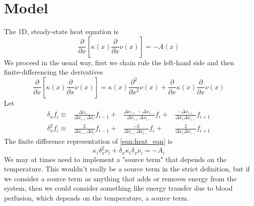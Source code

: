 \documentclass[letterpaper,12pt]{article}
\newcommand{\func}[1]{\left(#1\right)}
\begin{document}
\section{Model}
The 1D, steady-state heat equation is
\begin{equation}
  \label{eqn:heat_eqn}
  \frac{\partial }{\partial x}\left[ \kappa\func{x} \frac{\partial }{\partial x} \nu\func{x} \right] = -A\func{x}
\end{equation}
We proceed in the usual way, first we chain rule the left-hand side and then finite-differencing the derivatives
\begin{equation}
  \frac{\partial }{\partial x}\left[ \kappa\func{x} \frac{\partial  }{\partial x  } \nu\func{x} \right] = 
                                     \kappa\func{x} \frac{\partial^2}{\partial x^2} \nu\func{x}
 +\frac{\partial }{\partial x}       \kappa\func{x} \frac{\partial  }{\partial x  } \nu\func{x}
\end{equation}
Let
\begin{equation}
  \begin{array}{rrrr}
  \delta_x   f_i \equiv &\frac{                 \Delta x_{i-} }{ \Delta x_{i+}\Delta x_{i } } f_{i-1}
                       +&\frac{ \Delta x_{i+} - \Delta x_{i-} }{ \Delta x_{i+}\Delta x_{i-} } f_{i  }
                       +&\frac{-\Delta x_{i+}                 }{ \Delta x_{i }\Delta x_{i-} } f_{i+1} \\
  \delta^2_x f_i \equiv &\frac{               2               }{ \Delta x_{i+}\Delta x_{i } } f_{i-1}
                       +&\frac{              -2               }{ \Delta x_{i+}\Delta x_{i-} } f_{i  }
                       +&\frac{               2               }{ \Delta x_{i }\Delta x_{i-} } f_{i+1}
\end{array}
\end{equation}
The finite difference representation of \ref{eqn:heat_eqn} is
\begin{equation}
   \kappa_i \delta^2_x \nu_i
+  \delta_x \kappa_i \delta_x \nu_i
= -A_i
\end{equation}
We may at times need to implement a "source term" that depends on the
temperature. This wouldn't really be a source term in the strict definition,
but if we consider a source term as anything that adds or removes energy from
the system, then we could consider something like energy transfer due to blood perfusion,
which depends on the temperature, a source term.
\end{document}
